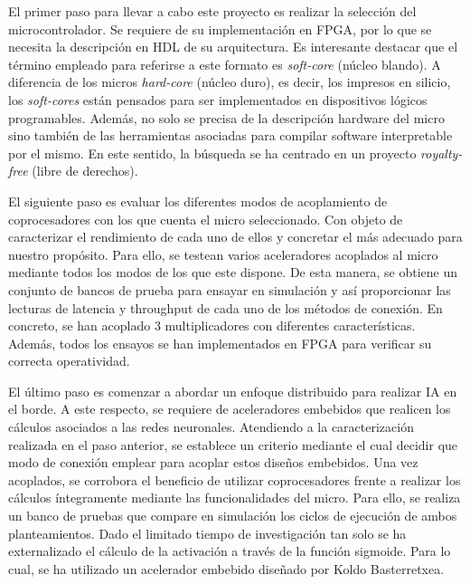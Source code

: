 El primer paso para llevar a cabo este proyecto es realizar la selección del microcontrolador.
Se requiere de su implementación en FPGA, por lo que se necesita la descripción en HDL de su arquitectura.
Es interesante destacar que el término empleado para referirse a este formato es \textit{soft-core} (núcleo blando).
A diferencia de los micros \textit{hard-core} (núcleo duro), es decir, los impresos en silicio, los \textit{soft-cores} están pensados para ser implementados en dispositivos lógicos programables. 
Además, no solo se precisa de la descripción hardware del micro sino también de las herramientas asociadas para compilar software interpretable por el mismo.
En este sentido, la búsqueda se ha centrado en un proyecto \textit{royalty-free} (libre de derechos).


El siguiente paso es evaluar los diferentes modos de acoplamiento de coprocesadores con los que cuenta el micro seleccionado.
Con objeto de caracterizar el rendimiento de cada uno de ellos y concretar el más adecuado para nuestro propósito.
Para ello, se testean varios aceleradores acoplados al micro mediante todos los modos de los que este dispone.
De esta manera, se obtiene un conjunto de bancos de prueba para ensayar en simulación y así proporcionar las lecturas de latencia y throughput de cada uno de los métodos de conexión.
En concreto, se han acoplado 3 multiplicadores con diferentes características.
Además, todos los ensayos se han implementados en FPGA para verificar su correcta operatividad.

El último paso es comenzar a abordar un enfoque distribuido para realizar IA en el borde. 
A este respecto, se requiere de aceleradores embebidos que realicen los cálculos asociados a las redes neuronales.
Atendiendo a la caracterización realizada en el paso anterior, se establece un criterio mediante el cual decidir que modo de conexión emplear para acoplar estos diseños embebidos.
Una vez acoplados, se corrobora el beneficio de utilizar coprocesadores frente a realizar los cálculos íntegramente mediante las funcionalidades del micro.
Para ello, se realiza un banco de pruebas que compare en simulación los ciclos de ejecución de ambos planteamientos.
Dado el limitado tiempo de investigación tan solo se ha externalizado el cálculo de la activación a través de la función sigmoide.
Para lo cual, se ha utilizado un acelerador embebido diseñado por Koldo Basterretxea.

